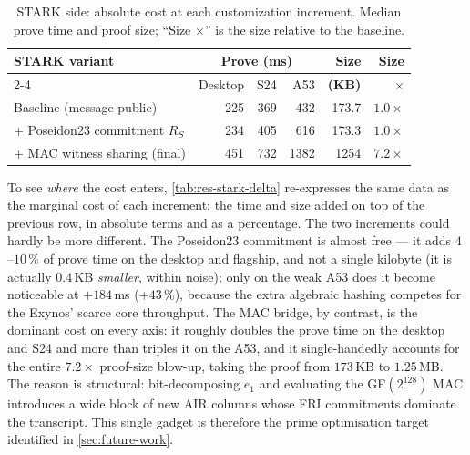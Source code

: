 \documentclass{article}
\begin{document}
\begin{table}[ht]
  \centering
  \caption{STARK side: absolute cost at each customization increment. Median
  prove time and proof size; ``Size $\times$'' is the size relative to the
  baseline.}
  \label{tab:res-stark-steps}
  \small
  \begin{tabular}{@{}lrrrrr@{}}
    \toprule
    \textbf{STARK variant} & \multicolumn{3}{c}{\textbf{Prove (ms)}} & \textbf{Size} & \textbf{Size} \\
    \cmidrule(lr){2-4}
     & Desktop & S24 & A53 & \textbf{(KB)} & \textbf{$\times$} \\
    \midrule
    Baseline (message public)                 & 225 & 369 & 432  & 173.7 & $1.0\times$ \\
    \;+ Poseidon23 commitment $R_S$           & 234 & 405 & 616  & 173.3 & $1.0\times$ \\
    \;+ MAC witness sharing (final)           & 451 & 732 & 1382 & 1254  & $7.2\times$ \\
    \bottomrule
  \end{tabular}
\end{table}

To see \emph{where} the cost enters, \cref{tab:res-stark-delta} re-expresses the
same data as the marginal cost of each increment: the time and size added on top
of the previous row, in absolute terms and as a percentage. The two increments
could hardly be more different. The Poseidon23 commitment is almost free --- it
adds $4$--$10\,\%$ of prove time on the desktop and flagship, and not a single
kilobyte (it is actually $0.4$\,KB \emph{smaller}, within noise); only on the weak
A53 does it become noticeable at $+184$\,ms ($+43\,\%$), because the extra
algebraic hashing competes for the Exynos' scarce core throughput. The MAC bridge,
by contrast, is the dominant cost on every axis: it roughly doubles the prove time
on the desktop and S24 and more than triples it on the A53, and it single-handedly
accounts for the entire $7.2\times$ proof-size blow-up, taking the proof from
$173$\,KB to $1.25$\,MB. The reason is structural: bit-decomposing $e_1$ and
evaluating the GF$(2^{128})$ MAC introduces a wide block of new AIR columns whose
FRI commitments dominate the transcript. This single gadget is therefore the prime
optimisation target identified in \cref{sec:future-work}.
\end{document}
